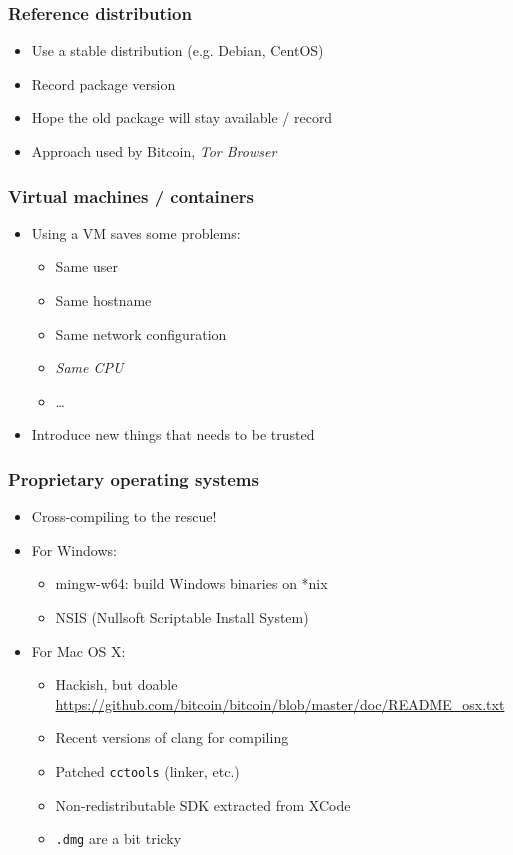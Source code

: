 \documentclass[14pt,aspectratio=169]{beamer}
\begin{document}
\begin{frame}
 \frametitle{Reference distribution}

 \begin{itemize}
  \item Use a stable distribution (e.g. Debian, CentOS)
  \item Record package version
  \item Hope the old package will stay available / record
  \item Approach used by Bitcoin, \textit{Tor Browser}
 \end{itemize}
\end{frame}

\begin{frame}
 \frametitle{Virtual machines / containers}

 \begin{itemize}
  \item Using a VM saves some problems:
   \begin{itemize}
    \item Same user
    \item Same hostname
    \item Same network configuration
    \item \textit{Same CPU}
    \item …
   \end{itemize}
  \item Introduce new things that needs to be trusted
 \end{itemize}
\end{frame}

\begin{frame}
 \frametitle{Proprietary operating systems}

 \begin{itemize}
  \item Cross-compiling to the rescue!
  \item For Windows:
   \begin{itemize}
     \item mingw-w64: build Windows binaries on *nix
     \item NSIS (Nullsoft Scriptable Install System)
   \end{itemize}
  \item For Mac OS X:
   \begin{itemize}
     \item Hackish, but doable \\
       {\footnotesize \url{https://github.com/bitcoin/bitcoin/blob/master/doc/README\_osx.txt}}
     \item Recent versions of clang for compiling
     \item Patched \texttt{cctools} (linker, etc.)
     \item Non-redistributable SDK extracted from XCode
     \item \texttt{.dmg} are a bit tricky
   \end{itemize}
 \end{itemize}
\end{frame}
\end{document}
